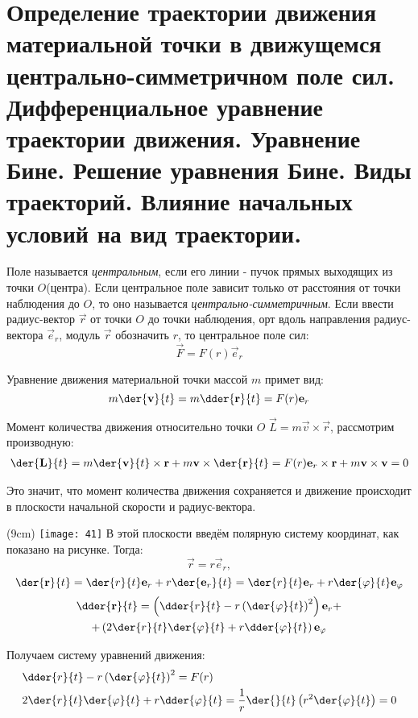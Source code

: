 \chapter{Определение траектории движения материальной точки в движущемся
центрально-симметричном поле сил. Дифференциальное уравнение траектории
движения. Уравнение Бине. Решение уравнения Бине. Виды траекторий. Влияние
начальных условий на вид траектории.}


Поле называется \textit{центральным}, если его линии - пучок прямых выходящих
из точки \( O \)(центра). Если центральное поле зависит только от расстояния от
точки наблюдения до \( O \), то оно называется \textit{центрально-симметричным}.
Если ввести радиус-вектор \( \vec{r} \) от точки \( O \) до точки наблюдения,
орт вдоль направления радиус-вектора \( \vec{e}_r \), модуль \( \vec{r} \)
обозначить \( r \), то центральное поле сил:
\[
    \vec{F} = F(r)\vec{e}_{r}
\]

Уравнение движения материальной точки массой \( m \) примет вид: 
\[
    m\der{\vec{v}}{t} = m\dder{\vec{r}}{t} = F(r)\vec{e}_{r}
\]
    
Момент количества движения относительно точки \( O \)
\( \vec{L} = m \vec{v} \times \vec{r} \), рассмотрим производную:
\begin{gather*}
    \der{\vec{L}}{t} = 
    m \der{\vec{v}}{t} \times \vec{r} + m \vec{v} \times \der{\vec{r}}{t} =
    F(r)\vec{e}_{r} \times \vec{r} + m \vec{v} \times \vec{v} = 
    0
\end{gather*}
    
Это значит, что момент количества движения сохраняется и движение происходит в
плоскости начальной скорости и радиус-вектора.

\sidefig(9cm)
{\texttt{[image: 41]}}{
В этой плоскости введём полярную систему координат, как показано на рисунке.
Тогда:
\[
    \vec{r} = r \vec{e}_{r},
\]
\[
    \der{\vec{r}}{t} = 
    \der{r}{t} \vec{e}_{r} + 
    r \der{\vec{e}_{r}}{t} =
    \der{r}{t} \vec{e}_{r} + 
    r \der{\varphi}{t}\vec{e}_{\varphi} 
\]
\begin{gather*}
    \dder{\vec{r}}{t} = 
    \left(
        \dder{r}{t} - 
        r
        \left(
        \der{\varphi}{t}
        \right)^2
    \right)\vec{e}_{r} + \\ +
    \left( 
        2\der{r}{t} \der{\varphi}{t}+ 
        r \dder{\varphi}{t}
    \right)\vec{e}_{\varphi} 
\end{gather*}   
}

Получаем систему уравнений движения:
\[
    \begin{split}
        &
        \dder{r}{t} - 
        r
        \left(
        \der{\varphi}{t}
        \right)^2 = 
        F(r)
        \\ 
        &
        2\der{r}{t} \der{\varphi}{t}+ 
        r \dder{\varphi}{t}
        =
        \frac{1}{r}
        \der{}{t}
        \left(
            r^2 \der{\varphi}{t}
        \right)
        = 0     
    \end{split}
\]

